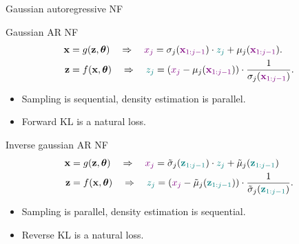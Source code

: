 \documentclass{beamer}
\begin{document}
\begin{frame}{Gaussian autoregressive NF}
	\begin{block}{Gaussian AR NF}
		\vspace{-0.6cm}
		\begin{align*}
			\mathbf{x} &= g(\mathbf{z}, \boldsymbol{\theta}) \quad \Rightarrow \quad {\color{violet}x_j} = \sigma_j ({\color{violet}\mathbf{x}_{1:j-1}}) \cdot {\color{teal} z_j} + \mu_j({\color{violet}\mathbf{x}_{1:j-1}}). \\
			\mathbf{z} &= f(\mathbf{x}, \boldsymbol{\theta}) \quad \Rightarrow \quad {\color{teal} z_j} = \left({\color{violet} x_j} - \mu_j({\color{violet}\mathbf{x}_{1:j-1}}) \right) \cdot \frac{1}{\sigma_j ({\color{violet} \mathbf{x}_{1:j-1}}) }.
		\end{align*}
		\vspace{-0.6cm}
		\begin{itemize}
			\item Sampling is sequential, density estimation is parallel.
			\item Forward KL is a natural loss.
		\end{itemize}
	\end{block}
	\begin{block}{Inverse gaussian AR NF}
		\vspace{-0.6cm}
		\begin{align*}
			\mathbf{x} &= g(\mathbf{z}, \boldsymbol{\theta}) \quad \Rightarrow \quad {\color{violet} x_j} = \tilde{\sigma}_j ({\color{teal}\mathbf{z}_{1:j-1}}) \cdot {\color{teal} z_j} + \tilde{\mu}_j({\color{teal}\mathbf{z}_{1:j-1}}) \\
			\mathbf{z} &= f(\mathbf{x}, \boldsymbol{\theta}) \quad \Rightarrow \quad {\color{teal}z_j} = \left( {\color{violet} x_j} - \tilde{\mu}_j({\color{teal}\mathbf{z}_{1:j-1}})\right) \cdot \frac{1}{\tilde{\sigma}_j ({\color{teal}\mathbf{z}_{1:j-1}}) }.
		\end{align*}
		\vspace{-0.6cm}
		\begin{itemize}
			\item Sampling is parallel, density estimation is sequential.
			\item Reverse KL is a natural loss.
		\end{itemize}
	\end{block}
\end{frame}
\end{document}
